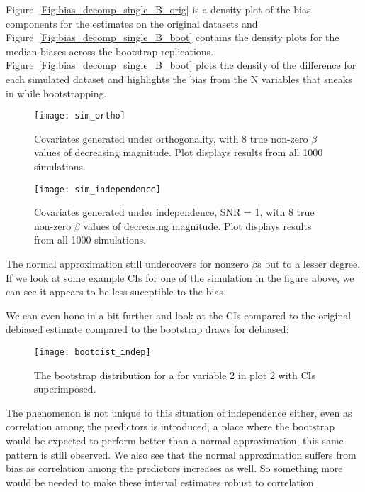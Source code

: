 Figure~\ref{Fig:bias_decomp_single_B_orig} is a density plot of the bias components for the estimates on the original datasets and Figure~\ref{Fig:bias_decomp_single_B_boot} contains the density plots for the median biases across the bootstrap replications. Figure~\ref{Fig:bias_decomp_single_B_boot} plots the density of the difference for each simulated dataset and highlights the bias from the N variables that sneaks in while bootstrapping.

\begin{figure}[hbtp]
    \begin{center}
    \texttt{[image: sim\_ortho]}
    \caption{\label{Fig:sim_ortho} Covariates generated under orthogonality, with 8 true non-zero $\beta$ values of decreasing magnitude. Plot displays results from all 1000 simulations.}
    \end{center}
\end{figure}

\begin{figure}[hbtp]
    \begin{center}
    \texttt{[image: sim\_independence]}
    \caption{\label{Fig:sim_independence} Covariates generated under independence, SNR = 1, with 8 true non-zero $\beta$ values of decreasing magnitude. Plot displays results from all 1000 simulations.}
    \end{center}
\end{figure}

The normal approximation still undercovers for nonzero $\beta$s but to a lesser degree. If we look at some example CIs for one of the simulation in the figure above, we can see it appears to be less suceptible to the bias.

We can even hone in a bit further and look at the CIs compared to the original debiased estimate compared to the bootstrap draws for debiased:

\begin{figure}[hbtp]
    \begin{center}
    \texttt{[image: bootdist\_indep]}
    \caption{\label{Fig:bootdist_indep} The bootstrap distribution for a for variable 2 in plot 2 with CIs superimposed. }
    \end{center}
\end{figure}

The phenomenon is not unique to this situation of independence either, even as correlation among the predictors is introduced, a place where the bootstrap would be expected to perform better than a normal approximation, this same pattern is still observed. We also see that the normal approximation suffers from bias as correlation among the predictors increases as well. So something more would be needed to make these interval estimates robust to correlation. 

